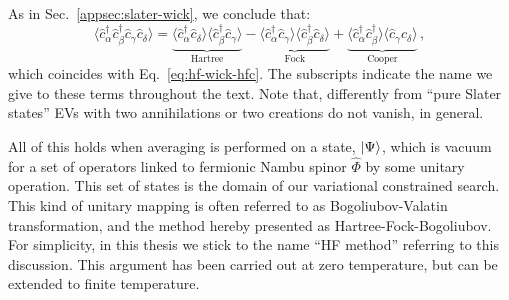 As in Sec.~\ref{appsec:slater-wick}, we conclude that:
\begin{equation}\label{appeq:hf-wick-hfc}
	\langle
	\hat c_\alpha^\dagger \hat c_\beta^\dagger \hat c_\gamma \hat c_\delta
	\rangle = \underbrace{
		\langle 
		\hat c_\alpha^\dagger \hat c_\delta
		\rangle \langle	
		\hat c_\beta^\dagger \hat c_\gamma 
		\rangle
	}_{\text{Hartree}}
	- 
	\underbrace{
		\langle 
		\hat c_\alpha^\dagger \hat c_\gamma
		\rangle \langle	
		\hat c_\beta^\dagger \hat c_\delta 
		\rangle 
	}_{\text{Fock}}
	+ 
	\underbrace{
		\langle 
		\hat c_\alpha^\dagger \hat c_\beta^\dagger
		\rangle \langle	
		\hat c_\gamma \hat c_\delta 
		\rangle 
	}_{\text{Cooper}} \, ,
\end{equation}
which coincides with Eq.~\eqref{eq:hf-wick-hfc}. The subscripts indicate the name we give to these terms throughout the text. Note that, differently from ``pure Slater states'' EVs with two annihilations or two creations do not vanish, in general.

All of this holds when averaging is performed on a state, $\ket{\Psi}$, which is vacuum for a set of operators linked to fermionic Nambu spinor $\hat \Phi$ by some unitary operation. This set of states is the domain of our variational constrained search. This kind of unitary mapping is often referred to as Bogoliubov-Valatin transformation, and the method hereby presented as Hartree-Fock-Bogoliubov. For simplicity, in this thesis we stick to the name ``HF method'' referring to this discussion. This argument has been carried out at zero temperature, but can be extended to finite temperature.